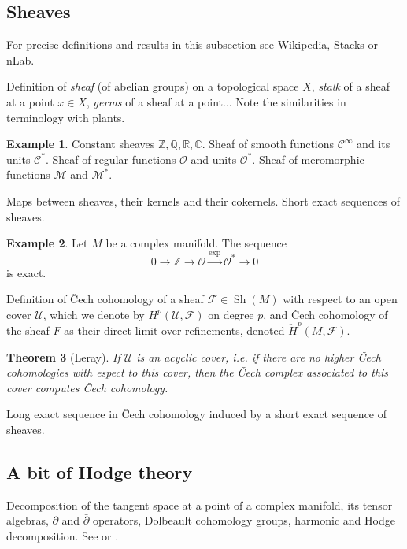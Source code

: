 \documentclass[11pt,A4]{article}
\theoremstyle{plain}
\newtheorem{thm}{Theorem}[section]
\theoremstyle{definition}
\newtheorem{exa}[thm]{Example}
\theoremstyle{remark}
\newcommand{\Z}{\mathbb{Z}}
\newcommand{\Q}{\mathbb{Q}}
\newcommand{\R}{\mathbb{R}}
\newcommand{\1}{\mathbbm{1}}
\newcommand{\C}{\mathbb{C}}
\newcommand{\calC}{\mathcal{C}}
\newcommand{\F}{\mathcal{F}}
\newcommand{\M}{\mathcal{M}}
\renewcommand{\O}{\mathcal{O}}
\newcommand{\U}{\mathcal{U}}
\DeclareMathOperator{\Sh}{Sh}
\begin{document}
\subsection{Sheaves}

For precise definitions and results in this subsection see Wikipedia, Stacks or nLab.

Definition of \textit{sheaf} (of abelian groups) on a topological space $X$, \textit{stalk} of a sheaf at a point $x\in X$, \textit{germs} of a sheaf at a point... Note the similarities in terminology with plants.

\begin{exa}
    Constant sheaves $\Z,\Q,\R,\C$.
    Sheaf of smooth functions $\calC^{\infty}$ and its units $\calC^{*}$.
    Sheaf of regular functions $\O$ and units $\O^{*}$.
    Sheaf of meromorphic functions $\M$ and $\M^{*}$.
\end{exa}

Maps between sheaves, their kernels and their cokernels.
Short exact sequences of sheaves.

\begin{exa}
    Let $M$ be a complex manifold.
    The sequence
    \[ 0\to \Z\to \O\xrightarrow{\exp} \O^{*}\to 0 \]
    is exact.
\end{exa}

Definition of \v{C}ech cohomology of a sheaf $\F\in \Sh(M)$ with respect to an open cover $\U$, which we denote by $H^{p}(\U,\F)$ on degree $p$, and \v{C}ech cohomology of the sheaf $F$ as their direct limit over refinements, denoted $\check{H}^{p}(M,\F)$.

\begin{thm}[Leray]
    If $\U$ is an acyclic cover, i.e. if there are no higher \v{C}ech cohomologies with espect to this cover, then the \v{C}ech complex associated to this cover computes \v{C}ech cohomology.
\end{thm}

Long exact sequence in \v{C}ech cohomology induced by a short exact sequence of sheaves.

\subsection{A bit of Hodge theory}

Decomposition of the tangent space at a point of a complex manifold, its tensor algebras, $\partial $ and $\bar{\partial }$ operators, Dolbeault cohomology groups, harmonic and Hodge decomposition.
See \cite{gh78} or \cite{voi07}.
\end{document}
